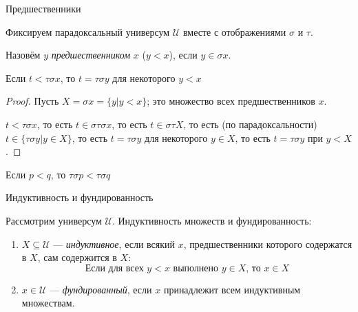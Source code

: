 \documentclass[aspectratio=169,dvipsnames,usenames]{beamer}
\begin{document}
\begin{frame}{Предшественники}

Фиксируем парадоксальный универсум $\mathcal{U}$ вместе с отображениями $\sigma$ и $\tau$.

\begin{dfn}
Назовём $y$ \emph{предшественником} $x$ ($y < x$), если $y \in \sigma x$.
\end{dfn}

\begin{lemma}
Если $t < \tau\sigma x$, то $t = \tau\sigma y$ для некоторого $y < x$
\end{lemma}
\begin{proof}
Пусть $X = \sigma x = \{ y | y < x \}$; это множество всех предшественников $x$.

$t < \tau\sigma x$, то есть $t \in \sigma\tau\sigma x$, то есть $t \in \sigma\tau X$, то есть (по парадоксальности) $t \in \{\tau\sigma y | y \in X \}$,
то есть $t = \tau\sigma y$ для некоторого $y \in X$, то есть $t = \tau\sigma y$ при $y < X$.
\end{proof}
\begin{lemma}
Если $p < q$, то $\tau\sigma p < \tau\sigma q$
\end{lemma}

\end{frame}

\begin{frame}{Индуктивность и фундированность}

\begin{dfn} Рассмотрим универсум $\mathcal{U}$. Индуктивность множеств и фундированность:

\begin{enumerate}
\item $X \subseteq \mathcal{U}$ --- \emph{индуктивное}, если всякий $x$, предшественники которого содержатся в $X$, сам содержится в $X$:
$$\text{Если для всех }y < x\text{ выполнено }y \in X\text{, то }x \in X$$

\item $x \in \mathcal{U}$ --- \emph{фундированный}, если $x$ принадлежит всем индуктивным множествам.
\end{enumerate}
\end{dfn}
\end{frame}
\end{document}
